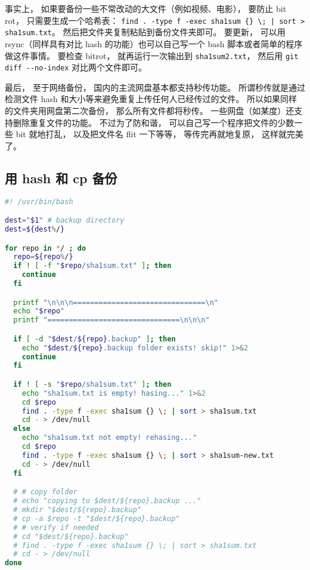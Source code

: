 
\begin{issues}
\issueDraft
\end{issues}


事实上， 如果要备份一些不常改动的大文件（例如视频、电影）， 要防止 bit rot， 只需要生成一个哈希表： \verb`find . -type f -exec sha1sum {} \; | sort > sha1sum.txt`。 然后把文件夹复制粘贴到备份文件夹即可。 要更新， 可以用 rsync（同样具有对比 hash 的功能）也可以自己写一个 bash 脚本或者简单的程序做这件事情。 要检查 bitrot， 就再运行一次输出到 \verb|sha1sum2.txt|， 然后用 \verb|git diff --no-index| 对比两个文件即可。

最后， 至于网络备份， 国内的主流网盘基本都支持秒传功能。 所谓秒传就是通过检测文件 hash 和大小等来避免重复上传任何人已经传过的文件。 所以如果同样的文件夹用网盘第二次备份， 那么所有文件都将秒传。 一些网盘（如某度）还支持删除重复文件的功能。 不过为了防和谐， 可以自己写一个程序把文件的少数一些 bit 就地打乱， 以及把文件名 flit 一下等等， 等传完再就地复原， 这样就完美了。

\subsection{用 hash 和 cp 备份}

\begin{lstlisting}[language=bash]
#! /usr/bin/bash

dest="$1" # backup directory
dest=${dest%/}

for repo in */ ; do
  repo=${repo%/}
  if ! [ -f "$repo/sha1sum.txt" ]; then
    continue
  fi

  printf "\n\n\n===============================\n"
  echo "$repo"
  printf "===============================\n\n\n"

  if [ -d "$dest/${repo}.backup" ]; then
    echo "$dest/${repo}.backup folder exists! skip!" 1>&2
    continue
  fi

  if ! [ -s "$repo/sha1sum.txt" ]; then
    echo "sha1sum.txt is empty! hasing..." 1>&2
    cd $repo
    find . -type f -exec sha1sum {} \; | sort > sha1sum.txt
    cd - > /dev/null
  else
    echo "sha1sum.txt not empty! rehasing..."
    cd $repo
    find . -type f -exec sha1sum {} \; | sort > sha1sum-new.txt
    cd - > /dev/null
  fi

  # # copy folder
  # echo "copying to $dest/${repo}.backup ..."
  # mkdir "$dest/${repo}.backup"
  # cp -a $repo -t "$dest/${repo}.backup"
  # # verify if needed
  # cd "$dest/${repo}.backup"
  # find . -type f -exec sha1sum {} \; | sort > sha1sum.txt
  # cd - > /dev/null
done
\end{lstlisting}

